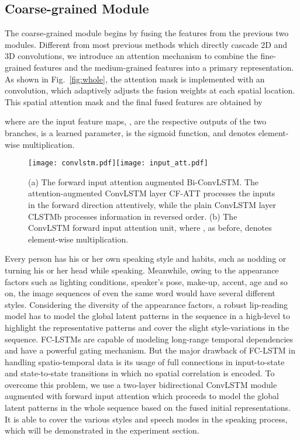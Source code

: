 \documentclass{bmvc2k}
\begin{document}
\vspace{-1em}
\subsection{Coarse-grained Module}
The coarse-grained module begins by fusing the features from the previous two modules. Different from most previous methods which directly cascade 2D and 3D convolutions, we introduce an attention mechanism to combine the fine-grained features and the medium-grained features into a primary representation. As shown in Fig.~\ref{fig:whole}, the attention mask is implemented with an  convolution, which adaptively adjusts the fusion weights at each spatial location. This spatial attention mask and the final fused features  are obtained by

where  are the input feature maps, ,  are the respective outputs of the two branches,  is a learned parameter,  is the sigmoid function, and  denotes element-wise multiplication.

\begin{figure*}
  \centering
  \centerline{\texttt{[image: convlstm.pdf]}\texttt{[image: input\_att.pdf]}}
\caption{(a) The forward input attention augmented Bi-ConvLSTM. The attention-augmented ConvLSTM layer CF-ATT processes the inputs in the forward direction attentively, while the plain ConvLSTM layer CLSTMb processes information in reversed order. (b) The ConvLSTM forward input attention unit, where , as before, denotes element-wise multiplication.}
\label{fig:convlstm}
\end{figure*}
Every person has his or her own speaking style and habits, such as nodding or turning his or her head while speaking. Meanwhile, owing to the appearance factors such as lighting conditions, speaker's pose, make-up, accent, age and so on, the image sequences of even the same word would have several different styles. Considering the diversity of the appearance factors, a robust lip-reading model has to model the global latent patterns in the sequence in a high-level to highlight the representative patterns and cover the slight style-variations in the sequence.
FC-LSTMs are capable of modeling long-range temporal dependencies and have a powerful gating mechanism. But the major drawback of FC-LSTM in handling spatio-temporal data is its usage of full connections in input-to-state and state-to-state transitions in which no spatial correlation is encoded. To overcome this problem, we use a two-layer bidirectional ConvLSTM module augmented with forward input attention which proceeds to model the global latent patterns in the whole sequence based on the fused initial representations. It is able to cover the various styles and speech modes in the speaking process, which will be demonstrated in the experiment section.
\end{document}

